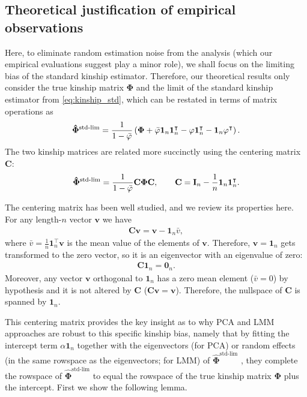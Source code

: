 \documentclass[11pt]{article}
\newcommand{\kinMat}{%
  \ensuremath{%
    \mathbf{\Phi}
  }%
  \xspace%
}%
\newcommand{\kinMatStdLim}{%
  \ensuremath{%
    \mathbf{\hat{\Phi}}^\text{std-lim}
  }%
  \xspace%
}%
\begin{document}
\subsection{Theoretical justification of empirical observations}

Here, to eliminate random estimation noise from the analysis (which our empirical evaluations suggest play a minor role), we shall focus on the limiting bias of the standard kinship estimator.
Therefore, our theoretical results only consider the true kinship matrix \kinMat and the limit of the standard kinship estimator from \cref{eq:kinship_std}, which can be restated in terms of matrix operations as
$$
\kinMatStdLim
=
\frac{1}{1 - \bar{\varphi}}
\left(
  \kinMat
  + \bar{\varphi} \mathbf{1}_n \mathbf{1}_n^\intercal 
  - \mathbf{\varphi} \mathbf{1}_n^\intercal 
  - \mathbf{1}_n \mathbf{\varphi}^\intercal 
\right)
.
$$
The two kinship matrices are related more succinctly using the centering matrix $\mathbf{C}$:
$$
\kinMatStdLim
=
\frac{1}{1 - \bar{\varphi}}
\mathbf{C} \kinMat \mathbf{C}
, \quad\quad
\mathbf{C}
=
\mathbf{I}_n - \frac{1}{n} \mathbf{1}_n \mathbf{1}_n^\intercal
.
$$

The centering matrix has been well studied, and we review its properties here.
For any length-$n$ vector $\mathbf{v}$ we have
\begin{align*}
  \mathbf{C} \mathbf{v}
  =
  \mathbf{v} - \mathbf{1}_n \bar{v}
  ,
\end{align*}
where $\bar{v} = \frac{1}{n} \mathbf{1}_n^\intercal \mathbf{v}$ is the mean value of the elements of $\mathbf{v}$.
Therefore, $\mathbf{v} = \mathbf{1}_n$ gets transformed to the zero vector, so it is an eigenvector with an eigenvalue of zero:
\begin{align*}
  \mathbf{C} \mathbf{1}_n
  =
  \mathbf{0}_n
  .
\end{align*}
Moreover, any vector $\mathbf{v}$ orthogonal to $\mathbf{1}_n$ has a zero mean element ($\bar{v} = 0$) by hypothesis and it is not altered by $\mathbf{C}$ ($\mathbf{C} \mathbf{v} = \mathbf{v}$).
Therefore, the nullspace of $\mathbf{C}$ is spanned by $\mathbf{1}_n$.

This centering matrix provides the key insight as to why PCA and LMM approaches are robust to this specific kinship bias, namely that by fitting the intercept term $\alpha \mathbf{1}_n$ together with the eigenvectors (for PCA) or random effects (in the same rowspace as the eigenvectors; for LMM) of \kinMatStdLim, they complete the rowspace of \kinMatStdLim to equal the rowspace of the true kinship matrix \kinMat plus the intercept.
First we show the following lemma.
\end{document}
